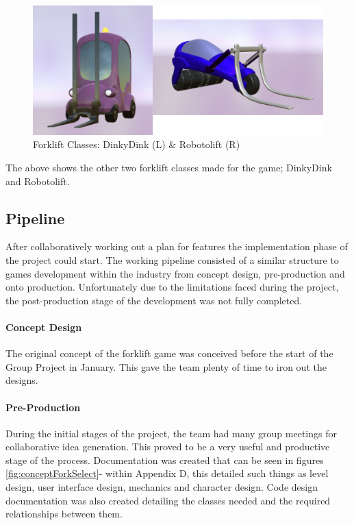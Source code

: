 \documentclass[12pt]{article}
\begin{document}
\begin{figure}[H]
	\caption{Forklift Classes: DinkyDink (L) \& Robotolift (R)}
	\includegraphics[width=\textwidth]{images/dinkyRobo}
\end{figure}
The above shows the other two forklift classes made for the game; DinkyDink and Robotolift. 


\subsection{Pipeline}

After collaboratively working out a plan for features the implementation phase of the project could start. The working pipeline consisted of a similar structure to games development within the industry from concept design, pre-production and onto production. Unfortunately due to the limitations faced during the project, the post-production stage of the development was not fully completed.

\paragraph{Concept Design}

The original concept of the forklift game was conceived before the start of the Group Project in January. This gave the team plenty of time to iron out the designs.

\paragraph{Pre-Production}

During the initial stages of the project, the team had many group meetings for collaborative idea generation. This proved to be a very useful and productive stage of the process. Documentation was created that can be seen in figures \ref{fig:conceptForkSelect}- within Appendix D, this detailed such things as level design, user interface design, mechanics and character design. Code design documentation was also created detailing the classes needed and the required relationships between them.
\end{document}
